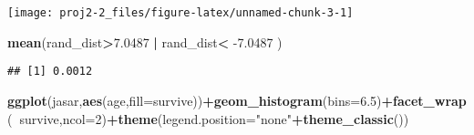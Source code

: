 \documentclass[]{article}
\newenvironment{Shaded}{\begin{snugshade}}{\end{snugshade}}
\newcommand{\ControlFlowTok}[1]{\textcolor[rgb]{0.13,0.29,0.53}{\textbf{#1}}}
\newcommand{\DataTypeTok}[1]{\textcolor[rgb]{0.13,0.29,0.53}{#1}}
\newcommand{\DecValTok}[1]{\textcolor[rgb]{0.00,0.00,0.81}{#1}}
\newcommand{\FloatTok}[1]{\textcolor[rgb]{0.00,0.00,0.81}{#1}}
\newcommand{\KeywordTok}[1]{\textcolor[rgb]{0.13,0.29,0.53}{\textbf{#1}}}
\newcommand{\NormalTok}[1]{#1}
\newcommand{\OperatorTok}[1]{\textcolor[rgb]{0.81,0.36,0.00}{\textbf{#1}}}
\newcommand{\StringTok}[1]{\textcolor[rgb]{0.31,0.60,0.02}{#1}}
\begin{document}
\begin{Shaded}
\end{Shaded}

\begin{center}\texttt{[image: proj2-2\_files/figure-latex/unnamed-chunk-3-1]} \end{center}

\begin{Shaded}
\begin{Highlighting}[]
\KeywordTok{mean}\NormalTok{(rand_dist}\OperatorTok{>}\FloatTok{7.0487}    \OperatorTok{|}\StringTok{ }\NormalTok{rand_dist}\OperatorTok{<}\StringTok{ }\FloatTok{-7.0487}\NormalTok{   )}
\end{Highlighting}
\end{Shaded}

\begin{verbatim}
## [1] 0.0012
\end{verbatim}

\begin{Shaded}
\begin{Highlighting}[]
\KeywordTok{ggplot}\NormalTok{(jasar,}\KeywordTok{aes}\NormalTok{(age,}\DataTypeTok{fill=}\NormalTok{survive))}\OperatorTok{+}\KeywordTok{geom_histogram}\NormalTok{(}\DataTypeTok{bins=}\FloatTok{6.5}\NormalTok{)}\OperatorTok{+}\KeywordTok{facet_wrap}\NormalTok{(}\OperatorTok{~}\NormalTok{survive,}\DataTypeTok{ncol=}\DecValTok{2}\NormalTok{)}\OperatorTok{+}\KeywordTok{theme}\NormalTok{(}\DataTypeTok{legend.position=}\StringTok{"none"}\OperatorTok{+}\KeywordTok{theme_classic}\NormalTok{())}
\end{Highlighting}
\end{Shaded}
\end{document}
